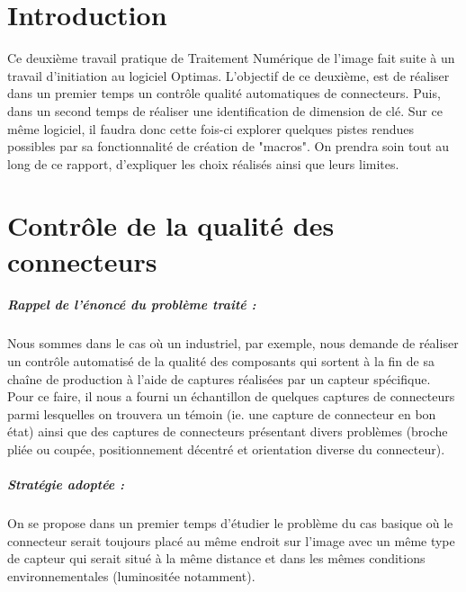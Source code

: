 \documentclass{scrreprt}
\begin{document}
\tableofcontents

\chapter{Introduction}

Ce deuxième travail pratique de Traitement Numérique de l'image fait suite à un travail d'initiation au logiciel
Optimas. L'objectif de ce deuxième, est de réaliser dans un premier temps un contrôle qualité automatiques de connecteurs. Puis, 
dans un second temps de réaliser une identification de dimension de clé. Sur ce même logiciel, il faudra donc cette fois-ci explorer
quelques pistes rendues possibles par sa fonctionnalité de création de "macros". On prendra soin tout au long de ce rapport, d'expliquer
les choix réalisés ainsi que leurs limites.


\chapter{Contrôle de la qualité des connecteurs}

\paragraph{Rappel de l'énoncé du problème traité :}
Nous sommes dans le cas où un industriel, par exemple, nous demande de réaliser un contrôle automatisé de la qualité des 
composants qui sortent à la fin de sa chaîne de production à l'aide de captures réalisées par un capteur spécifique.
Pour ce faire, il nous a fourni un échantillon de quelques captures de connecteurs parmi lesquelles on trouvera 
un témoin (ie. une capture de connecteur en bon état) ainsi que des captures de connecteurs présentant divers 
problèmes (broche pliée ou coupée, positionnement décentré et orientation diverse du connecteur).  

\paragraph{Stratégie adoptée :}
On se propose dans un premier temps d'étudier le problème du cas basique où le connecteur serait toujours placé
au même endroit sur l'image avec un même type de capteur qui serait situé à la même distance et dans les mêmes conditions 
environnementales (luminositée notamment). 
\end{document}
